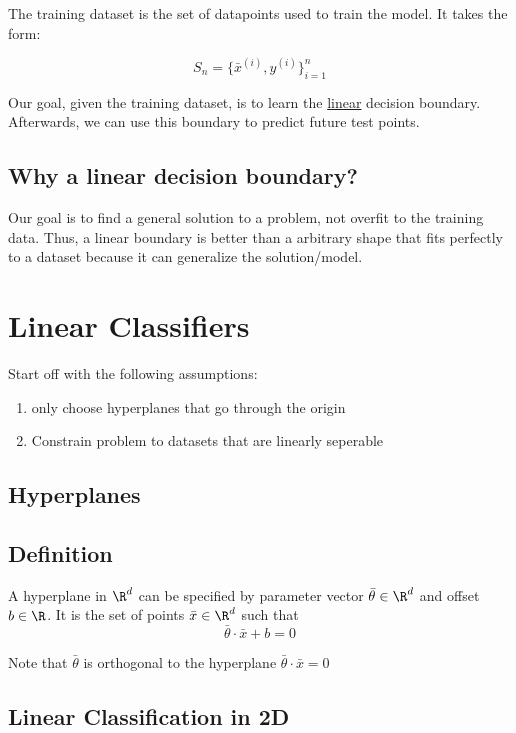 \documentclass[12pt]{article}
\begin{document}
The training dataset is the set of datapoints used to train the model. It takes the form:

\[ S_n = \{ \bar{x}^{(i)}, y^{(i)} \}_{i=1}^n \]

Our goal, given the training dataset, is to learn the \underline{linear} decision boundary. Afterwards, we can use this boundary to predict future test points.

\subsection{Why a linear decision boundary?}

Our goal is to find a general solution to a problem, not overfit to the training data. Thus, a linear boundary is better than a arbitrary shape that fits perfectly to a dataset because it can generalize the solution/model.

\section{Linear Classifiers}

Start off with the following assumptions:

\begin{enumerate}
	\item only choose hyperplanes that go through the origin
	\item Constrain problem to datasets that are linearly seperable
\end{enumerate}

\subsection{Hyperplanes}

\subsection{Definition}

A hyperplane in $\R^d$ can be specified by parameter vector $\bar{\theta} \in \R^d$ and offset $b \in \R$. It is the set of points $\bar{x} \in \R^d$ such that 
\[ \bar{\theta} \cdot \bar{x} + b = 0 \]

Note that $\bar{\theta}$ is orthogonal to the hyperplane $\bar{\theta} \cdot \bar{x} = 0$

\subsection{Linear Classification in 2D}
\end{document}

